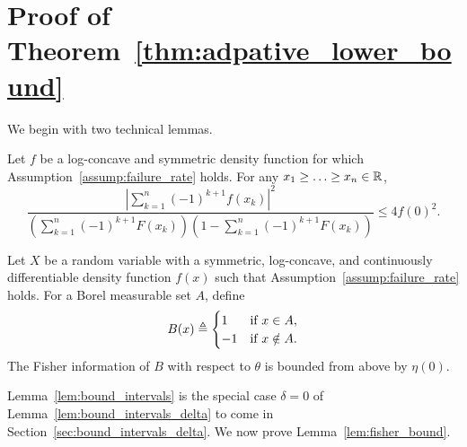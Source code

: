 \section{Proof of Theorem~\ref{thm:adpative_lower_bound}}
\label{proof:thm:adpative_lower_bound}

We begin with two technical lemmas.
\begin{lem} \label{lem:bound_intervals}
  Let $f$ be a log-concave and symmetric density function
  for which Assumption~\ref{assump:failure_rate} holds. For any $x_1 \geq
  \ldots \geq x_n \in \mathbb{R}$,
  \begin{equation}
    \frac{ \left| \sum_{k=1}^n (-1)^{k+1} f(x_k) \right|^2 }{
      \left( \sum_{k=1}^n (-1)^{k+1} F(x_k) \right) \left(1- \sum_{k=1}^n (-1)^{k+1} F(x_k) \right) } 
    \leq  4f(0)^2.
    \label{eq:lem_bound_intervals}
  \end{equation}
\end{lem}
\begin{lem} \label{lem:fisher_bound}
  Let $X$ be a random variable with a symmetric, log-concave, and
  continuously differentiable density function $f(x)$ such that Assumption~\ref{assump:failure_rate} holds. For a Borel measurable set $A$, define
  \begin{equation*}
    B(x) \triangleq \begin{cases} 1
      & \mbox{if} ~x \in A, \\
      -1 & \mbox{if}~ x \notin A.
    \end{cases}
  \end{equation*}
  The Fisher information of $B$ with respect to $\theta$ is bounded from above by $\eta(0)$.
\end{lem}

Lemma~\ref{lem:bound_intervals} is the special case $\delta = 0$ of
Lemma~\ref{lem:bound_intervals_delta} to come in
Section~\ref{sec:bound_intervals_delta}. We now prove
Lemma~\ref{lem:fisher_bound}.

